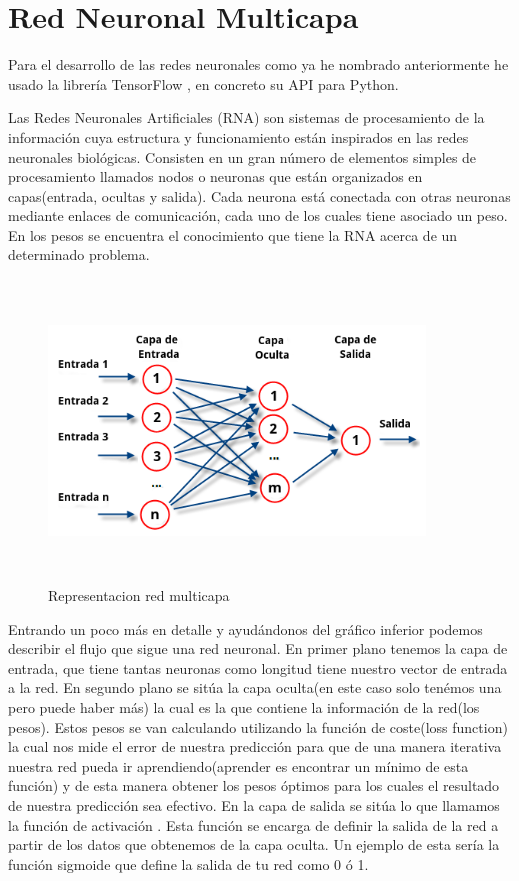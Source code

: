 \documentclass{article}
\begin{document}
\section{Red Neuronal Multicapa}

Para el desarrollo de las redes neuronales como ya he nombrado anteriormente he usado la librería TensorFlow \cite{tensorflow2015-whitepaper}, en concreto su API para Python.

Las Redes Neuronales Artificiales (RNA) \cite{RNA} son sistemas de procesamiento de la información cuya estructura y funcionamiento están inspirados en las redes neuronales biológicas. Consisten en un gran número de elementos simples de procesamiento llamados nodos o neuronas que están organizados en capas(entrada, ocultas y salida). Cada neurona está conectada con otras neuronas mediante enlaces de comunicación, cada uno de los cuales tiene asociado un peso. En los pesos se encuentra el conocimiento que tiene la RNA acerca de un determinado problema.

\begin{figure}[H]
  \centering
  \includegraphics[width=100mm, height=80mm]{images/multilayer_nn.png}
  \caption{Representacion red multicapa}
\end{figure}


Entrando un poco más en detalle y ayudándonos del gráfico inferior podemos describir el flujo que sigue una red neuronal. En primer plano tenemos la capa de entrada, que tiene tantas neuronas como longitud tiene nuestro vector de entrada a la red. En segundo plano se sitúa la capa oculta(en este caso solo tenémos una pero puede haber más) la cual es la que contiene la información de la red(los pesos). Estos pesos se van calculando utilizando la función de coste(loss function) \cite{loss_function} la cual nos mide el error de nuestra predicción para que de una manera iterativa nuestra red pueda ir aprendiendo(aprender es encontrar un mínimo de esta función) y de esta manera obtener los pesos óptimos para los cuales el resultado de nuestra predicción sea efectivo.
En la capa de salida se sitúa lo que llamamos la función de activación \cite{activation_function}. Esta función se encarga de definir la salida de la red a partir de los datos que obtenemos de la capa oculta. Un ejemplo de esta sería la función sigmoide \cite{sigmoid} que define la salida de tu red como 0 ó 1.
\end{document}
